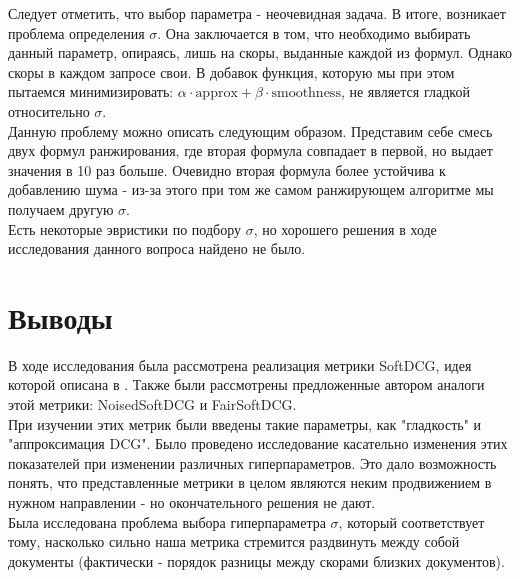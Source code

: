 \documentclass[14pt,a4paper]{amsart}
\theoremstyle{definition}
\theoremstyle{definition}
\renewcommand\i{\textit}
\renewcommand\t{\text}
\begin{document}
Следует отметить, что выбор параметра - неочевидная задача. В итоге, возникает проблема определения $\sigma$. Она заключается в том, что необходимо выбирать данный параметр, опираясь, лишь на скоры, выданные каждой из формул. Однако скоры в каждом запросе свои. В добавок функция, которую мы при этом пытаемся минимизировать: 
\i{$\alpha \cdot \t{approx} + \beta \cdot \t{smoothness}$}, не является гладкой  относительно $\sigma$. \\

Данную проблему можно описать следующим образом. Представим себе смесь двух формул ранжирования, где вторая формула совпадает в первой, но выдает значения в 10 раз больше. Очевидно вторая формула более устойчива к добавлению шума - из-за этого при том же самом ранжирующем алгоритме мы получаем другую $\sigma$.\\

Есть некоторые эвристики по подбору $\sigma$, но хорошего решения в ходе исследования данного вопроса найдено не было.


\newpage
\section{Выводы}

В ходе исследования была рассмотрена реализация метрики SoftDCG, идея которой описана в \cite{SoftDCGPaper}. Также были рассмотрены предложенные автором аналоги этой метрики: NoisedSoftDCG и FairSoftDCG. \\

При изучении этих метрик были введены такие параметры, как "гладкость" и "аппроксимация DCG". Было проведено исследование касательно изменения этих показателей при изменении различных гиперпараметров. Это дало возможность понять, что представленные метрики в целом являются неким продвижением в нужном направлении - но окончательного решения не дают. \\

Была исследована проблема выбора гиперпараметра $\sigma$, который соответствует тому, насколько сильно наша метрика стремится раздвинуть между собой документы (фактически - порядок разницы между скорами близких документов). 


\newpage
\end{document}
